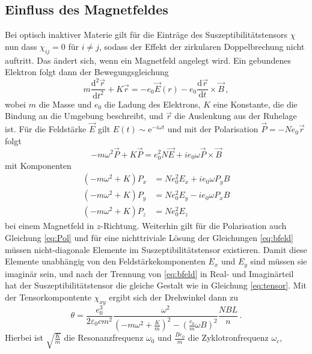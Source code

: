 \subsection{Einfluss des Magnetfeldes}
Bei optisch inaktiver Materie gilt für die Einträge des Suszeptibilitätstensors $\chi$ nun dass $\chi_{ij} = 0$ für $i \neq j$, 
sodass der Effekt der zirkularen Doppelbrechung nicht auftritt. Das ändert sich, wenn ein Magnetfeld angelegt wird. 
Ein gebundenes Elektron folgt dann der Bewegungsgleichung
\begin{equation*}
    m \frac{\text{d}^2 \vec{r}}{\text{d} t^2} + K \vec{r} = - e_0 \vec{E}(r) - e_0 \frac{\text{d} \vec{r}}{\text{d} t} \times \vec{B} \, ,
\end{equation*} 
wobei $m$ die Masse und $e_0$ die Ladung des Elektrons, $K$ eine Konstante, die die Bindung an die Umgebung beschreibt, und
$\vec{r}$ die Auslenkung aus der Ruhelage ist. Für die Feldstärke $\vec{E}$ gilt $E(t) \sim \text{e}^{- i \omega t}$ und
mit der Polarisation $\vec{P} = - N e_0 \vec{r}$ folgt
\begin{equation*}
    -m \omega^2 \vec{P} + K \vec{P} = e_0^2 N \vec{E} + i e_0 \omega \vec{P} \times \vec{B}
\end{equation*}
mit Komponenten
\begin{align}
    \label{eq:bfeld}
    \left(- m \omega ^2 + K\right) P_x &= N e_0^2 E_x + i e_0 \omega P_y B \\
    \left(- m \omega ^2 + K\right) P_y &= N e_0^2 E_y - i e_0 \omega P_x B \\
    \left(- m \omega ^2 + K\right) P_z &= N e_0^2 E_z  
\end{align}
bei einem Magnetfeld in $z$-Richtung. Weiterhin gilt für die Polarisation auch Gleichung \eqref{eq:Pol} und für eine nichttriviale 
Lösung der Gleichungen \eqref{eq:bfeld} müssen nicht-diagonale Elemente im Suszeptibilitätstensor existieren. Damit diese
Elemente unabhängig von den Feldstärkekomponenten $E_x$ und $E_y$ sind müssen sie imaginär sein, und nach der Trennung von
\eqref{eq:bfeld} in Real- und Imaginärteil hat der Suszeptibilitätstensor die gleiche Gestalt wie in Gleichung \eqref{eq:tensor}.
Mit der Tensorkompontente $\chi_{xy}$ ergibt sich der Drehwinkel dann zu
\begin{equation*}
    \theta = \frac{e_0^3}{2 \varepsilon_0 c m^2} \frac{\omega^2}{\left(- m \omega^2 + \frac{K}{m}\right)^2 - \left(\frac{e_0}{m} \omega B\right)^2} \frac{N B L}{n} \, . 
\end{equation*}
Hierbei ist $\sqrt{\frac{K}{m}}$ die Resonanzfrequenz $\omega_0$ und $\frac{B e_0}{m}$ die Zyklotronfrequenz $\omega_c$, 
